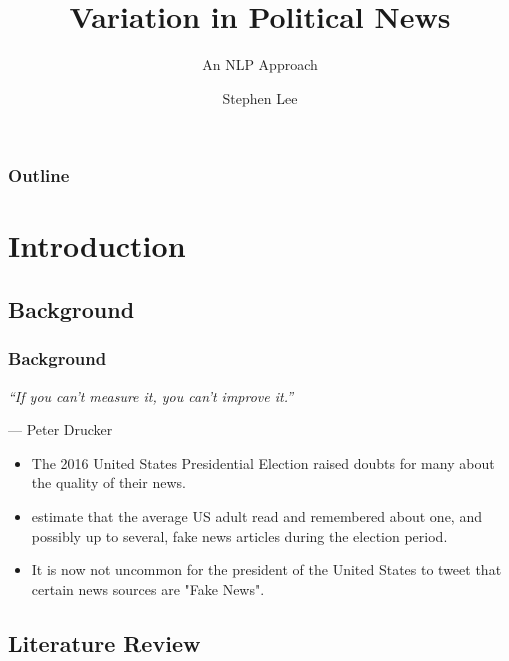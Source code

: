 \documentclass{beamer}
\title{Variation in Political News}
\subtitle{An NLP Approach}
\author{Stephen Lee}
\institute{University of Memphis}
\begin{document}
	

	\begin{frame}
		\maketitle
	\end{frame}

    \begin{frame}
    	\frametitle{Outline}
    	\tableofcontents
    \end{frame}


\section{Introduction}

    \subsection{Background}
   
    \begin{frame}
   	    \frametitle{Background}
   	    \begin{center}
   	    	\textit{``If you can't measure it, you can't improve it.''}
   	    \end{center}
   	    \begin{flushright}
   	    	--- Peter Drucker
   	    \end{flushright}
       
       \begin{itemize}
       	\item The 2016 United States Presidential Election raised doubts for many about the quality of their news.
       	\item \citet{allcott2017social} estimate that the average US adult read and remembered about one, and possibly up to several, fake news articles during the election period.
       	\item It is now not uncommon for the president of the United States to tweet that certain news sources are "Fake News". 
       \end{itemize}
    \end{frame}
   
	\subsection{Literature Review}
	
\end{document}
